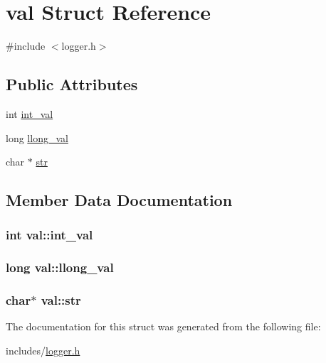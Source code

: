 \hypertarget{structval}{}\section{val Struct Reference}
\label{structval}


{\ttfamily \#include $<$logger.\+h$>$}

\subsection*{Public Attributes}
\begin{DoxyCompactItemize}
\item 
int \hyperlink{structval_afa7f75220c3e4d6c03cb795cf4eb0def}{int\+\_\+val}
\item 
long \hyperlink{structval_a28519535eeb30b959e1c366cd4a5ae55}{llong\+\_\+val}
\item 
char $\ast$ \hyperlink{structval_a09c4e31207ec081758a8008b694fba33}{str}
\end{DoxyCompactItemize}


\subsection{Member Data Documentation}
\subsubsection[{\texorpdfstring{int\+\_\+val}{int_val}}]{\setlength{\rightskip}{0pt plus 5cm}int val\+::int\+\_\+val}\hypertarget{structval_afa7f75220c3e4d6c03cb795cf4eb0def}{}\label{structval_afa7f75220c3e4d6c03cb795cf4eb0def}
\subsubsection[{\texorpdfstring{llong\+\_\+val}{llong_val}}]{\setlength{\rightskip}{0pt plus 5cm}long val\+::llong\+\_\+val}\hypertarget{structval_a28519535eeb30b959e1c366cd4a5ae55}{}\label{structval_a28519535eeb30b959e1c366cd4a5ae55}
\subsubsection[{\texorpdfstring{str}{str}}]{\setlength{\rightskip}{0pt plus 5cm}char$\ast$ val\+::str}\hypertarget{structval_a09c4e31207ec081758a8008b694fba33}{}\label{structval_a09c4e31207ec081758a8008b694fba33}


The documentation for this struct was generated from the following file\+:\begin{DoxyCompactItemize}
\item 
includes/\hyperlink{logger_8h}{logger.\+h}\end{DoxyCompactItemize}
